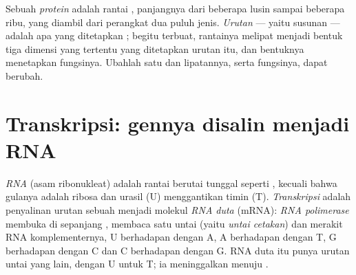\begin{definition}\label{def:g11:gene-expression:protein}
Sebuah \emph{protein} adalah rantai ,
panjangnya dari beberapa lusin sampai beberapa ribu, yang diambil dari
perangkat dua puluh jenis. \emph{Urutan} --- yaitu susunan  --- adalah apa yang ditetapkan ; begitu terbuat,
rantainya melipat menjadi bentuk tiga dimensi yang tertentu yang
ditetapkan urutan itu, dan bentuknya menetapkan fungsinya. Ubahlah satu
 dan lipatannya, serta fungsinya, dapat berubah.
\end{definition}

\section{Transkripsi: gennya disalin menjadi RNA}

\begin{definition}\label{def:g11:gene-expression:transcription}
\emph{RNA} (asam ribonukleat) adalah rantai 
berutai tunggal seperti  , kecuali bahwa gulanya adalah
ribosa dan  urasil (U) menggantikan timin (T).
\emph{Transkripsi} adalah penyalinan urutan sebuah
 menjadi molekul \emph{RNA duta} (mRNA): 
\emph{RNA polimerase} membuka  di sepanjang ,
membaca satu untai (yaitu \emph{untai cetakan}) dan merakit RNA
komplementernya, U berhadapan dengan A, A berhadapan dengan T, G
berhadapan dengan C dan C berhadapan dengan G. RNA duta itu punya
urutan untai  yang lain, dengan U untuk T; ia meninggalkan  menuju .
\end{definition}

